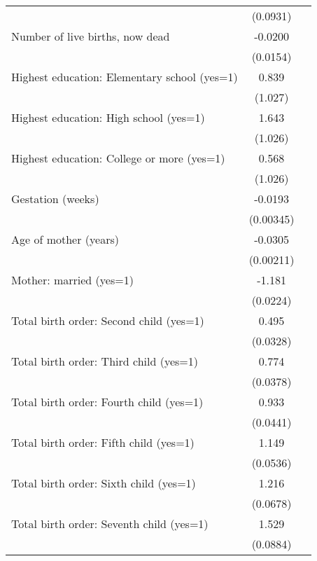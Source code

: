\begin{tabular}{l*{2}{c}}
                    &    (0.0931)&            \\
[1em]
Number of live births, now dead&     -0.0200&            \\
                    &    (0.0154)&            \\
[1em]
Highest education: Elementary school (yes=1)&       0.839&            \\
                    &     (1.027)&            \\
[1em]
Highest education: High school (yes=1)&       1.643&            \\
                    &     (1.026)&            \\
[1em]
Highest education: College or more (yes=1)&       0.568&            \\
                    &     (1.026)&            \\
[1em]
Gestation (weeks)   &     -0.0193&            \\
                    &   (0.00345)&            \\
[1em]
Age of mother (years)&     -0.0305&            \\
                    &   (0.00211)&            \\
[1em]
Mother: married (yes=1)&      -1.181&            \\
                    &    (0.0224)&            \\
[1em]
Total birth order: Second child (yes=1)&       0.495&            \\
                    &    (0.0328)&            \\
[1em]
Total birth order: Third child (yes=1)&       0.774&            \\
                    &    (0.0378)&            \\
[1em]
Total birth order: Fourth child (yes=1)&       0.933&            \\
                    &    (0.0441)&            \\
[1em]
Total birth order: Fifth child (yes=1)&       1.149&            \\
                    &    (0.0536)&            \\
[1em]
Total birth order: Sixth child (yes=1)&       1.216&            \\
                    &    (0.0678)&            \\
[1em]
Total birth order: Seventh child (yes=1)&       1.529&            \\
                    &    (0.0884)&            \\

\end{tabular}
